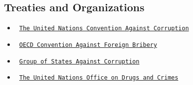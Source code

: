 \documentclass[10pt, letterpaper]{article}
\begin{document}
\subsection{Treaties and Organizations}

\begin{itemize}
\item
\texttt{ 
  \href{https://www.unodc.org/unodc/en/treaties/CAC/}{The United Nations Convention Against Corruption}}
  \item
  \texttt{ 
  \href{http://www.oecd.org/corruption/oecdantibriberyconvention.htm}{OECD Convention Against Foreign Bribery}}
  \item
  \texttt{ 
  \href{https://www.coe.int/en/web/greco}{Group of States Against Corruption}}
  \item
  \texttt{ 
  \href{https://www.unodc.org/}{The United Nations Office on Drugs and Crimes}}
  \end{itemize}
\end{document}
